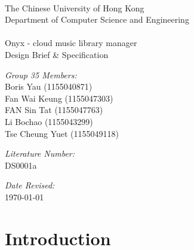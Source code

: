 \documentclass[12pt, a4paper, oneside]{article}
\begin{document}
\setcounter{page}{0}
\thispagestyle{empty}

\begin{center} \*\\
    \vspace{40mm}
    {\Large The Chinese University of Hong Kong\\Department of Computer Science and Engineering} \\ %
    \vspace{20mm}
    \hfill \\
    {\Huge Onyx - cloud music library manager} \\ %
    \vspace{8mm}
    {\Large Design Brief \& Specification} \\ %
    \vspace{20mm} 
\end{center}

\begin{minipage}{0.5\textwidth} %
    \begin{flushleft} \large

        \emph{Group 35 Members:}\\
        Boris Yau (1155040871)\\
        Fan Wai Keung (1155047303)\\
        FAN Sin Tat (1155047763)\\
        Li Bochao (1155043299)\\
        Tse Cheung Yuet (1155049118)
        \vspace{8mm}

    \end{flushleft}
\end{minipage}
\begin{minipage}{0.4\textwidth} %
    \begin{flushright} \large

        \emph{Literature Number:} \\
        DS0001a \vspace{8mm}

        \emph{Date Revised:} \\
        \today \vspace{8mm}

    \end{flushright}
\end{minipage}

\newpage
\tableofcontents %

\newpage
\section{Introduction}
\end{document}
